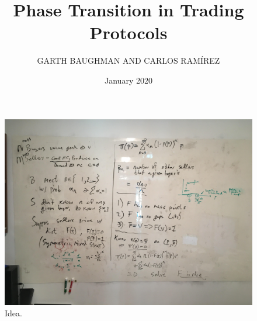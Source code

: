 \documentclass{article}
\title{Phase Transition in Trading Protocols}
\author{GARTH BAUGHMAN AND CARLOS RAM\'IREZ}
\date{January 2020}
\begin{document}
\maketitle

\begin{figure}
    \includegraphics[height=\textwidth, width =1.2\textheight ]{figures/paper.jpg}
    \caption{Idea.}
    \label{fig:PropProf}
\end{figure}
\end{document}
